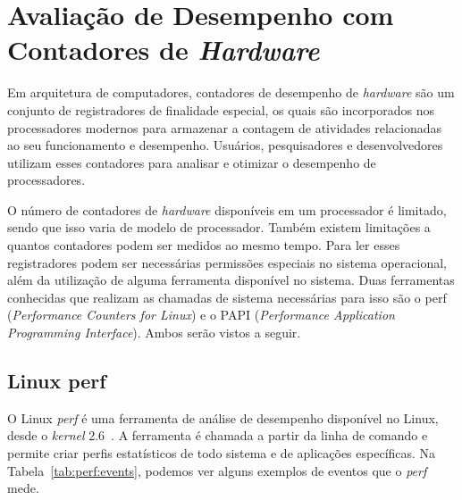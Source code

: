 \section{Avaliação de Desempenho com Contadores de \textit{Hardware}} \label{sec:contadores}

Em arquitetura de computadores, contadores de desempenho de \textit{hardware} são um conjunto de registradores de finalidade especial, os quais são incorporados nos processadores modernos para armazenar a contagem de atividades relacionadas ao seu funcionamento e desempenho. Usuários, pesquisadores e desenvolvedores utilizam esses contadores para analisar e otimizar o desempenho de processadores.

O número de contadores de \textit{hardware} disponíveis em um processador é limitado, sendo que isso varia de modelo de processador. Também existem limitações a quantos contadores podem ser medidos ao mesmo tempo. Para ler esses registradores podem ser necessárias permissões especiais no sistema operacional, além da utilização de alguma ferramenta disponível no sistema. Duas ferramentas conhecidas que realizam as chamadas de sistema necessárias para isso são o perf (\emph{Performance Counters for Linux}) e o PAPI (\emph{Performance Application Programming Interface}). Ambos serão vistos a seguir.

\subsection{Linux perf} \label{sec:perf}

O Linux \emph{perf} é uma ferramenta de análise de desempenho disponível no Linux, desde o \textit{kernel} 2.6~\cite{DeMelo2010, weaver2013linux}. A ferramenta é chamada a partir da linha de comando e permite criar perfis estatísticos de todo sistema e de aplicações específicas. Na Tabela~\ref{tab:perf:events}, podemos ver alguns exemplos de eventos que o \emph{perf} mede. 

